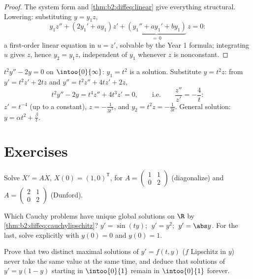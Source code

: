 \begin{proof}
The system form and \cref{thm:b2:diffeq:linear} give everything
structural. Lowering: substituting $y = y_1z$,
\[
y_1 z'' + (2y_1' + a y_1)z' + \underbrace{(y_1'' + ay_1' +
by_1)}_{=\,0}\,z = 0 :
\]
a first-order linear equation in $u = z'$, solvable by the Year 1
formula; integrating $u$ gives $z$, hence $y_2 = y_1 z$,
independent of $y_1$ whenever $z$ is nonconstant.
\end{proof}

\begin{example}\label{ex:b2:diffeq:lowering}
$t^2y'' - 2y = 0$ on $\intoo{0}{\infty}$: $y_1 = t^2$ is a
solution. Substitute $y = t^2z$: from $y' = t^2z' + 2tz$ and $y''
= t^2z'' + 4tz' + 2z$,
\[
t^2y'' - 2y = t^4 z'' + 4t^3z' = 0,
\qquad\text{i.e.}\qquad \frac{z''}{z'} = -\frac4t :
\]
$z' = t^{-4}$ (up to a constant), $z = -\frac{1}{3t^3}$, and $y_2
= t^2z = -\frac{1}{3t}$. General solution: $y = \alpha t^2 +
\frac{\beta}{t}$.
\end{example}

\section{Exercises}

\begin{exercise}[$\star$]\label{exo:b2:diffeq:1}
Solve $X' = AX$, $X(0) = (1, 0)^{\mathsf T}$, for $A =
\begin{pmatrix} 1 & 1\\ 0 & 2\end{pmatrix}$ (diagonalize) and $A =
\begin{pmatrix} 2 & 1\\ 0 & 2 \end{pmatrix}$ (Dunford).
\end{exercise}

\begin{exercise}[$\star$]\label{exo:b2:diffeq:2}
Which Cauchy problems have unique global solutions on $\R$ by
\cref{thm:b2:diffeq:cauchylipschitz}? $y' = \sin(ty)$; $\;y' =
y^2$; $\;y' = \abs y$. For the last, solve explicitly with $y(0) =
0$ and $y(0) = 1$.
\end{exercise}

\begin{exercise}[$\star$]\label{exo:b2:diffeq:3}
Prove that two distinct maximal solutions of $y' = f(t,y)$ ($f$
Lipschitz in $y$) never take the same value at the same time, and
deduce that solutions of $y' = y(1 - y)$ starting in
$\intoo{0}{1}$ remain in $\intoo{0}{1}$ forever.
\end{exercise}

